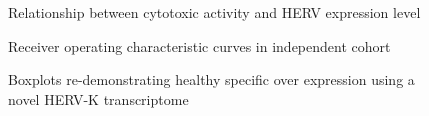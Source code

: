 \documentclass[11pt,letterpaper]{article}
\begin{document}
\begin{figure}[ht]
  \caption{Relationship between cytotoxic activity and HERV expression level}
  \label{fig:cd8}
\end{figure}

\begin{figure}[ht]
  \caption{Receiver operating characteristic curves in independent cohort}
  \label{fig:rocC}
\end{figure}

\begin{figure}[ht]
  \caption{Boxplots re-demonstrating healthy specific over expression using a novel HERV-K transcriptome}
  \label{fig:grabski_method}
\end{figure}
\end{document}
